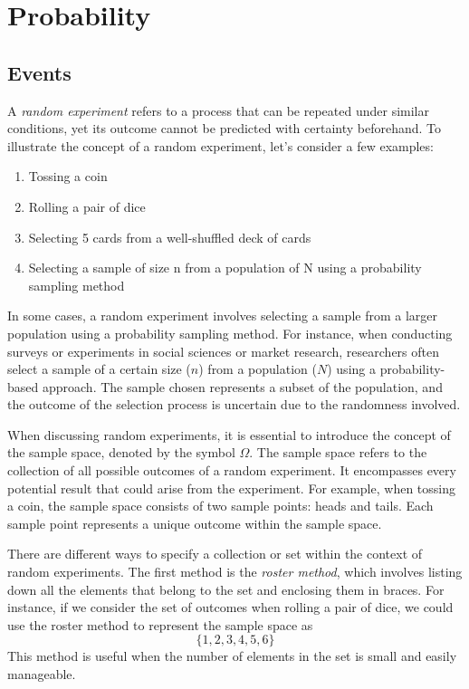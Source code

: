 \documentclass{article}
\begin{document}
\section{Probability}

\subsection{Events}

A \emph{random experiment} refers to a process that can be repeated under similar conditions, yet its outcome cannot be predicted with certainty beforehand. To illustrate the concept of a random experiment, let's consider a few examples:

\begin{enumerate}
\item Tossing a coin
\item Rolling a pair of dice
\item Selecting 5 cards from a well-shuffled deck of cards
\item Selecting a sample of size n from a population of N using a probability sampling method
\end{enumerate}

In some cases, a random experiment involves selecting a sample from a larger population using a probability sampling method. For instance, when conducting surveys or experiments in social sciences or market research, researchers often select a sample of a certain size ($n$) from a population ($N$) using a probability-based approach. The sample chosen represents a subset of the population, and the outcome of the selection process is uncertain due to the randomness involved.

When discussing random experiments, it is essential to introduce the concept of the sample space, denoted by the symbol $\Omega$. The sample space refers to the collection of all possible outcomes of a random experiment. It encompasses every potential result that could arise from the experiment. For example, when tossing a coin, the sample space consists of two sample points: heads and tails. Each sample point represents a unique outcome within the sample space.

There are different ways to specify a collection or set within the context of random experiments. The first method is the \emph{roster method}, which involves listing down all the elements that belong to the set and enclosing them in braces. For instance, if we consider the set of outcomes when rolling a pair of dice, we could use the roster method to represent the sample space as 
$$\{1, 2, 3, 4, 5, 6\}$$
This method is useful when the number of elements in the set is small and easily manageable.
\end{document}
